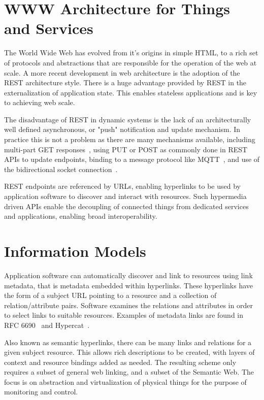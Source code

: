 \documentclass[journal]{IEEEtran}
\begin{document}
\section{WWW Architecture for Things and Services}

The World Wide Web has evolved from it’s origins in simple HTML, to a rich set of protocols and abstractions that are responsible for the operation of the web at scale. A more recent development in web architecture is the adoption of the REST architecture style. There is a huge advantage provided by REST in the externalization of application state. This enables stateless applications and is key to achieving web scale. 

The disadvantage of REST in dynamic systems is the lack of an architecturally well defined asynchronous, or "push" notification and update mechanism. In practice this is not a problem as there are many mechanisms available, including multi-part GET responses~\cite{draft-ietf-core-coap}, using PUT or POST as commonly done in REST APIs to update endpoints, binding to a message protocol like MQTT~\cite{MQTT}, and use of the bidirectional socket connection~\cite{RFC6455}.

REST endpoints are referenced by URLs, enabling hyperlinks to be used by application software to discover and interact with resources. Such hypermedia driven APIs enable the decoupling of connected things from dedicated services and applications, enabling broad interoperability. 

\section{Information Models}
 
Application software can automatically discover and link to resources using link metadata, that is metadata embedded within hyperlinks. These hyperlinks have the form of a subject URL pointing to a resource and a collection of relation/attribute pairs. Software examines the relations and attributes in order to select links to suitable resources. Examples of metadata links are found in RFC 6690~\cite{RFC6690} and Hypercat~\cite{HyperCat}.

Also known as semantic hyperlinks, there can be many links and relations for a given subject resource. This allows rich descriptions to be created, with layers of context and resource bindings added as needed. The resulting scheme only requires a subset of general web linking, and a subset of the Semantic Web. The focus is on abstraction and virtualization of physical things for the purpose of monitoring and control. 
\end{document}
